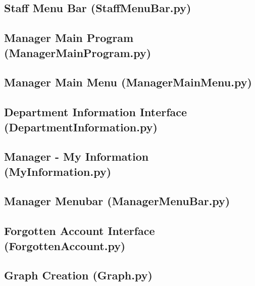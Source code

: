 \begin{landscape}
\begin{footnotesize}
\newpage
\subsection{Staff Menu Bar (StaffMenuBar.py)}\label{SMB}

\newpage
\subsection{Manager Main Program (ManagerMainProgram.py)}\label{MMP}

\newpage
\subsection{Manager Main Menu (ManagerMainMenu.py)}\label{MMM}

\newpage
\subsection{Department Information Interface (DepartmentInformation.py)}\label{SI}

\newpage
\subsection{Manager - My Information (MyInformation.py)}\label{MI}

\newpage
\subsection{Manager Menubar (ManagerMenuBar.py)}\label{MMB}

\newpage
\subsection{Forgotten Account Interface (ForgottenAccount.py)}\label{FA}

\newpage
\subsection{Graph Creation (Graph.py)}\label{G}


\end{footnotesize}
\end{landscape}
